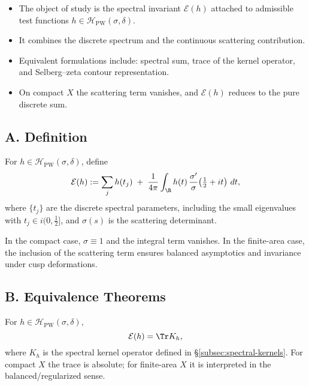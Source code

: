 \begin{tcolorbox}[colback=gray!5,colframe=gray!55,
  title=Scope and Assumptions (Part 3/5)]
\begin{itemize}
  \item The object of study is the spectral invariant $\mathcal E(h)$ attached to admissible test functions $h\in \mathcal H_{\mathrm{PW}}(\sigma,\delta)$.
  \item It combines the discrete spectrum and the continuous scattering contribution.
  \item Equivalent formulations include: spectral sum, trace of the kernel operator, and Selberg–zeta contour representation.
  \item On compact $X$ the scattering term vanishes, and $\mathcal E(h)$ reduces to the pure discrete sum.
\end{itemize}
\end{tcolorbox}

\subsection*{A. Definition}
\label{subsec:def-Eh}

\begin{definition}
\label{def:Eh}
For $h\in \mathcal H_{\mathrm{PW}}(\sigma,\delta)$, define
\begin{equation}\label{eq:def-Eh}
  \mathcal E(h) := \sum_{j} h(t_j) \;+\; \frac{1}{4\pi}\int_{\R} h(t)\,\frac{\sigma'}{\sigma}\!\left(\tfrac12+it\right)\,dt,
\end{equation}
where $\{t_j\}$ are the discrete spectral parameters, including the small eigenvalues with $t_j\in i(0,\tfrac12]$, and $\sigma(s)$ is the scattering determinant.
\end{definition}

\begin{remark}
In the compact case, $\sigma\equiv 1$ and the integral term vanishes. In the finite-area case, the inclusion of the scattering term ensures balanced asymptotics and invariance under cusp deformations.
\end{remark}

\subsection*{B. Equivalence Theorems}
\label{subsec:equiv-Eh}

\begin{theorem}
\label{thm:equiv-kernel}
For $h\in\mathcal H_{\mathrm{PW}}(\sigma,\delta)$,
\[
  \mathcal E(h) = \Tr K_h,
\]
where $K_h$ is the spectral kernel operator defined in \S\ref{subsec:spectral-kernels}. For compact $X$ the trace is absolute; for finite-area $X$ it is interpreted in the balanced/regularized sense.
\end{theorem}

